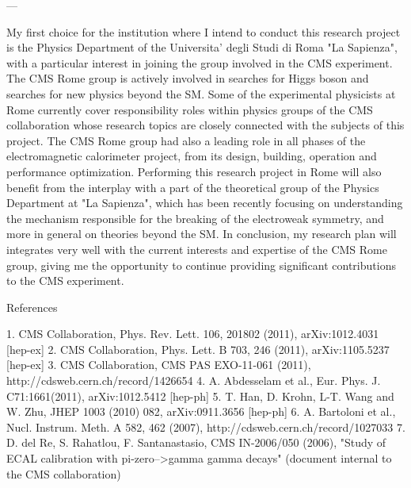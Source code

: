 \documentclass[10pt, a4paper]{article}
\begin{document}
---

My first choice for the institution where I intend to conduct this research project is the Physics Department of the Universita' degli Studi di Roma "La Sapienza", with a particular interest in joining the group involved in the CMS experiment. 
The CMS Rome group is actively involved in searches for Higgs boson and searches for new physics beyond the SM. Some of the experimental physicists at Rome currently cover responsibility roles within physics groups of the CMS collaboration whose research topics are closely connected with the subjects of this project. The CMS Rome group had also a leading role in all phases of the electromagnetic calorimeter project, from its design, building, operation and performance optimization.
Performing this research project in Rome will also benefit from the interplay with a part of the theoretical group of the Physics Department at "La Sapienza", which has been recently focusing on understanding the mechanism responsible for the breaking of the electroweak symmetry, and more in general on theories beyond the SM.
In conclusion, my research plan will integrates very well with the current interests and expertise of the CMS Rome group, giving me the opportunity to continue providing significant contributions to the CMS experiment. 


References

1. CMS Collaboration, Phys. Rev. Lett. 106, 201802 (2011), arXiv:1012.4031 [hep-ex]  
2. CMS Collaboration, Phys. Lett. B 703, 246 (2011), arXiv:1105.5237 [hep-ex] 
3. CMS Collaboration, CMS PAS EXO-11-061 (2011), http://cdsweb.cern.ch/record/1426654   
4. A. Abdesselam et al., Eur. Phys. J. C71:1661(2011), arXiv:1012.5412 [hep-ph] 
5. T. Han, D. Krohn, L-T. Wang and W. Zhu, JHEP 1003 (2010) 082, arXiv:0911.3656 [hep-ph] 
6. A. Bartoloni et al., Nucl. Instrum. Meth. A 582, 462 (2007), http://cdsweb.cern.ch/record/1027033 
7. D. del Re, S. Rahatlou, F. Santanastasio,  CMS IN-2006/050 (2006), "Study of ECAL calibration with pi-zero-->gamma gamma decays"  (document internal to the CMS collaboration)


\end{document}
